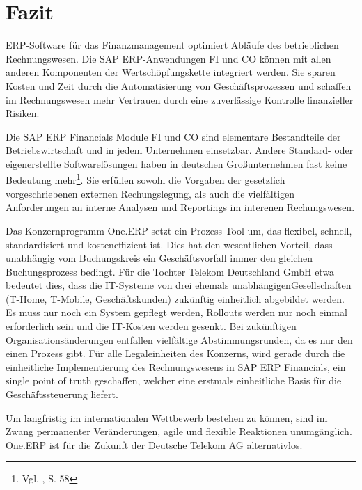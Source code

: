 \newpage
\section{Fazit}
ERP-Software für das Finanzmanagement optimiert Abläufe des betrieblichen Rechnungswesen. Die SAP ERP-Anwendungen FI und CO können mit allen anderen Komponenten der Wertschöpfungskette integriert werden. Sie sparen Kosten und Zeit durch die Automatisierung von Geschäftsprozessen und schaffen im Rechnungswesen mehr Vertrauen durch eine zuverlässige Kontrolle finanzieller Risiken. 

Die SAP ERP Financials Module FI und CO sind elementare Bestandteile der Betriebswirtschaft und in jedem Unternehmen einsetzbar. Andere  Standard- oder eigenerstellte Softwarelösungen haben in deutschen Großunternehmen fast keine Bedeutung mehr\footnote{Vgl. \cite{Gleich2010}, S. 58}. Sie erfüllen sowohl die Vorgaben der gesetzlich vorgeschriebenen externen Rechungslegung, als auch die vielfältigen Anforderungen an interne Analysen und Reportings im interenen Rechungswesen. 

Das Konzernprogramm One.ERP setzt ein Prozess-Tool um, das flexibel, schnell, standardisiert und kosteneffizient ist. Dies hat den wesentlichen Vorteil, dass unabhängig vom Buchungskreis ein Geschäftsvorfall immer den gleichen Buchungsprozess bedingt. Für die Tochter Telekom Deutschland GmbH etwa bedeutet dies, dass die IT-Systeme von drei ehemals \glqq unabhängigen\grqq Gesellschaften (T-Home, T-Mobile, Geschäftskunden) zukünftig einheitlich abgebildet werden. Es muss nur noch ein System gepflegt werden, Rollouts werden nur noch einmal erforderlich sein und die IT-Kosten werden gesenkt. Bei zukünftigen Organisationsänderungen entfallen vielfältige Abstimmungsrunden, da es nur den einen Prozess gibt. Für alle Legaleinheiten des Konzerns, wird gerade durch die einheitliche Implementierung des Rechnungswesens in SAP ERP Financials, ein single point of truth geschaffen, welcher eine erstmals einheitliche Basis für die Geschäftssteuerung liefert.

Um langfristig im internationalen Wettbewerb bestehen zu können, sind im Zwang permanenter Veränderungen, agile und flexible Reaktionen unumgänglich. One.ERP ist für die Zukunft der Deutsche Telekom AG alternativlos.